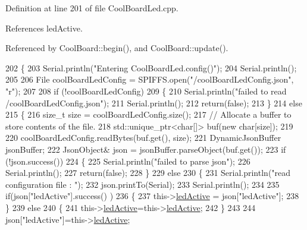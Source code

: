 Definition at line 201 of file Cool\+Board\+Led.\+cpp.



References led\+Active.



Referenced by Cool\+Board\+::begin(), and Cool\+Board\+::update().


\begin{DoxyCode}
202 \{
203     Serial.println(\textcolor{stringliteral}{"Entering CoolBoardLed.config()"});
204     Serial.println();
205     
206     File coolBoardLedConfig = SPIFFS.open(\textcolor{stringliteral}{"/coolBoardLedConfig.json"}, \textcolor{stringliteral}{"r"});
207 
208     \textcolor{keywordflow}{if} (!coolBoardLedConfig) 
209     \{
210         Serial.println(\textcolor{stringliteral}{"failed to read /coolBoardLedConfig.json"});
211         Serial.println();
212         \textcolor{keywordflow}{return}(\textcolor{keyword}{false});
213     \}
214     \textcolor{keywordflow}{else}
215     \{
216         \textcolor{keywordtype}{size\_t} size = coolBoardLedConfig.size();
217         \textcolor{comment}{// Allocate a buffer to store contents of the file.}
218         std::unique\_ptr<char[]> buf(\textcolor{keyword}{new} \textcolor{keywordtype}{char}[size]);
219 
220         coolBoardLedConfig.readBytes(buf.get(), size);
221         DynamicJsonBuffer jsonBuffer;
222         JsonObject& json = jsonBuffer.parseObject(buf.get());
223         \textcolor{keywordflow}{if} (!json.success()) 
224         \{
225             Serial.println(\textcolor{stringliteral}{"failed to parse json"});
226             Serial.println();
227             \textcolor{keywordflow}{return}(\textcolor{keyword}{false});
228         \} 
229         \textcolor{keywordflow}{else}
230         \{   
231             Serial.println(\textcolor{stringliteral}{"read configuration file : "});
232             json.printTo(Serial);
233             Serial.println();
234   
235             \textcolor{keywordflow}{if}(json[\textcolor{stringliteral}{"ledActive"}].success() )
236             \{
237                 this->\hyperlink{classCoolBoardLed_a5f17c135516fcf4b44ea8a096ba0177a}{ledActive} = json[\textcolor{stringliteral}{"ledActive"}]; 
238             \}
239             \textcolor{keywordflow}{else}
240             \{
241                 this->\hyperlink{classCoolBoardLed_a5f17c135516fcf4b44ea8a096ba0177a}{ledActive}=this->\hyperlink{classCoolBoardLed_a5f17c135516fcf4b44ea8a096ba0177a}{ledActive};          
242             \}
243             
244             json[\textcolor{stringliteral}{"ledActive"}]=this->\hyperlink{classCoolBoardLed_a5f17c135516fcf4b44ea8a096ba0177a}{ledActive};

\end{DoxyCode}
